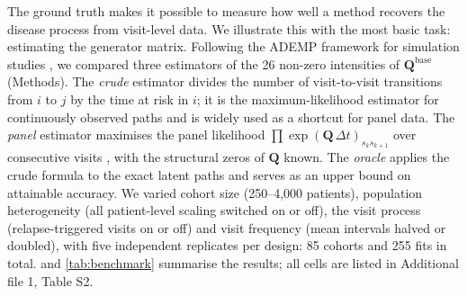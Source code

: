 \documentclass[11pt,a4paper]{article}
\newcommand{\Q}{\mathbf{Q}}
\begin{document}
The ground truth makes it possible to measure how well a method recovers the disease process from visit-level data. We illustrate this with the most basic task: estimating the generator matrix. Following the ADEMP framework for simulation studies \cite{morris2019}, we compared three estimators of the 26 non-zero intensities of $\Q^{\mathrm{base}}$ (Methods). The \emph{crude} estimator divides the number of visit-to-visit transitions from $i$ to $j$ by the time at risk in $i$; it is the maximum-likelihood estimator for continuously observed paths and is widely used as a shortcut for panel data. The \emph{panel} estimator maximises the panel likelihood $\prod \exp(\Q\,\Delta t)_{s_k s_{k+1}}$ over consecutive visits \cite{kalbfleisch1985,jackson2011}, with the structural zeros of $\Q$ known. The \emph{oracle} applies the crude formula to the exact latent paths and serves as an upper bound on attainable accuracy. We varied cohort size (250--4,000 patients), population heterogeneity (all patient-level scaling switched on or off), the visit process (relapse-triggered visits on or off) and visit frequency (mean intervals halved or doubled), with five independent replicates per design: 85 cohorts and 255 fits in total.  and \cref{tab:benchmark} summarise the results; all cells are listed in Additional file 1, Table S2.
\end{document}
